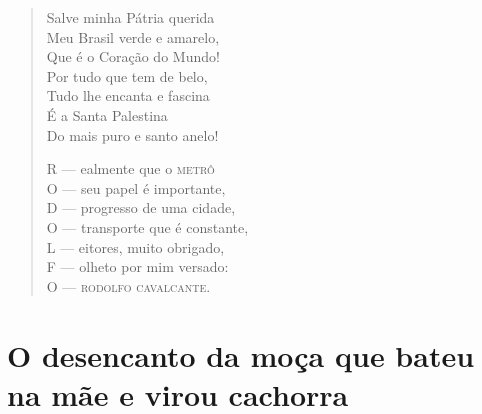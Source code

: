 \begin{verse}
Salve minha Pátria querida \\
Meu Brasil verde e amarelo, \\
Que é o Coração do Mundo! \\
Por tudo que tem de belo, \\
Tudo lhe encanta e fascina \\
É a Santa Palestina \\
Do mais puro e santo anelo! 


R --- ealmente que o \textsc{metrô} \\
O --- seu papel é importante, \\
D --- progresso de uma cidade, \\
O --- transporte que é constante, \\
L --- eitores, muito obrigado, \\
F --- olheto por mim versado:\\
O --- \textsc{rodolfo cavalcante}. 
\end{verse}

\chapter{O desencanto da moça que bateu na mãe e virou cachorra}

